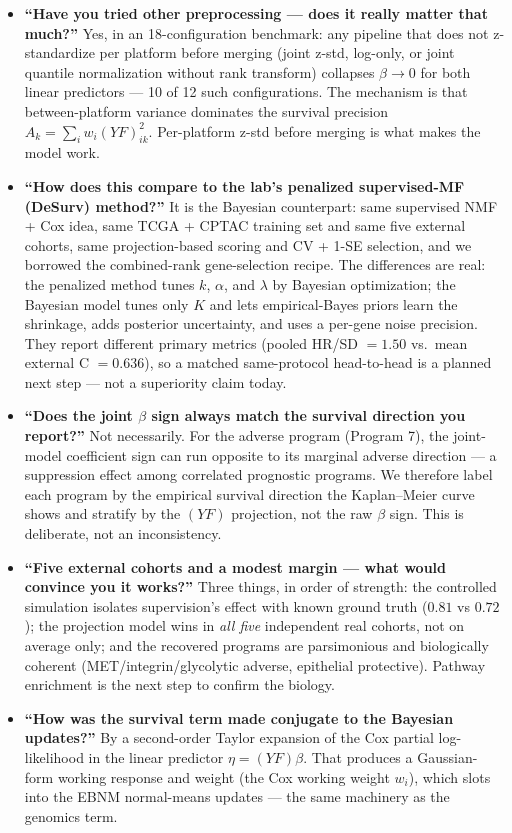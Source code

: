 \documentclass[11pt]{article}
\newcommand{\sectionlabel}[1]{\textbf{#1}}
\begin{document}
\begin{itemize}
\item \sectionlabel{``Have you tried other preprocessing --- does it really matter that much?''} Yes,
in an 18-configuration benchmark: any pipeline that does not z-standardize per platform before merging
(joint z-std, log-only, or joint quantile normalization without rank transform) collapses $\beta \to 0$
for both linear predictors --- 10 of 12 such configurations. The mechanism is that between-platform
variance dominates the survival precision $A_k = \sum_i w_i (YF)_{ik}^2$. Per-platform z-std before
merging is what makes the model work.

\item \sectionlabel{``How does this compare to the lab's penalized supervised-MF (DeSurv) method?''}
It is the Bayesian counterpart: same supervised NMF + Cox idea, same TCGA + CPTAC training set and
same five external cohorts, same projection-based scoring and CV + 1-SE selection, and we borrowed the
combined-rank gene-selection recipe. The differences are real: the penalized method tunes $k$,
$\alpha$, and $\lambda$ by Bayesian optimization; the Bayesian model tunes only $K$ and lets
empirical-Bayes priors learn the shrinkage, adds posterior uncertainty, and uses a per-gene noise
precision. They report different primary metrics (pooled HR/SD $= 1.50$ vs.\ mean external C $= 0.636$),
so a matched same-protocol head-to-head is a planned next step --- not a superiority claim today.

\item \sectionlabel{``Does the joint $\beta$ sign always match the survival direction you report?''}
Not necessarily. For the adverse program (Program 7), the joint-model coefficient sign can run
opposite to its marginal adverse direction --- a suppression effect among correlated prognostic
programs. We therefore label each program by the empirical survival direction the Kaplan--Meier curve
shows and stratify by the $(YF)$ projection, not the raw $\beta$ sign. This is deliberate, not an
inconsistency.

\item \sectionlabel{``Five external cohorts and a modest margin --- what would convince you it works?''}
Three things, in order of strength: the controlled simulation isolates supervision's effect with known
ground truth ($0.81$ vs $0.72$); the projection model wins in \emph{all five} independent real cohorts,
not on average only; and the recovered programs are parsimonious and biologically coherent
(MET/integrin/glycolytic adverse, epithelial protective). Pathway enrichment is the next step to
confirm the biology.

\item \sectionlabel{``How was the survival term made conjugate to the Bayesian updates?''} By a
second-order Taylor expansion of the Cox partial log-likelihood in the linear predictor $\eta = (YF)\beta$.
That produces a Gaussian-form working response and weight (the Cox working weight $w_i$), which slots
into the EBNM normal-means updates --- the same machinery as the genomics term.
\end{itemize}
\end{document}
